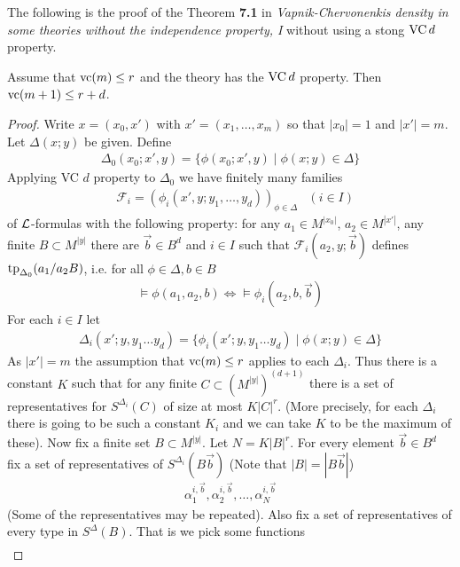 \documentclass{amsart}
\newcommand{\D}{\Delta}
\newcommand{\F}{\mathcal F}
\begin{document}
The following is the proof of the Theorem \textbf{7.1} in \textit{Vapnik-Chervonenkis density in some theories without the independence property, I} without using a stong $\operatorname{VC} d$ property.
\ \\
\begin{Theorem}
	Assume that $\operatorname{vc}(m) \leq r$ and the theory has the $\operatorname{VC} d$ property. Then $\operatorname{vc}(m+1) \leq r + d$.
\end{Theorem}
\begin{proof}
	Write $x = (x_0, x')$ with $x' = (x_1, \ldots, x_m)$ so that $|x_0| = 1$ and $|x'| = m$. Let $\D(x;y)$ be given. Define
	\begin{align*}
		\D_0(x_0;x', y) = \{\phi(x_0; x', y) \mid \phi(x;y) \in \D\}
	\end{align*}
	Applying VC $d$ property to $\D_0$ we have finitely many families 
	\begin{align*}
		&\F_i = (\phi_i(x', y; y_1, \ldots, y_d))_{\phi \in \D} &(i \in I)
	\end{align*}
	of $\mathcal L$-formulas with the following property: for any $a_1 \in M^{|x_0|}$, $a_2 \in M^{|x'|}$, any finite $B \subset M^{|y|}$ there are $\vec b \in B^d$ and $i \in I$ such that $\F_i(a_2, y; \vec b)$ defines $\tp_{\D_0}(a_1/a_2B)$, i.e. for all $\phi \in \D, b \in B$
	\begin{align*}
		\models \phi(a_1, a_2, b) \iff \models \phi_i(a_2, b, \vec b)
	\end{align*}
	For each $i \in I$ let
	\begin{align*}
		\D_i(x';y, y_1 \ldots y_d) = \{\phi_i(x'; y, y_1 \ldots y_d) \mid \phi(x;y) \in \D\}
	\end{align*}
	As $|x'| = m$ the assumption that $\operatorname{vc}(m) \leq r$ applies to each $\D_i$. Thus there is a constant $K$ such that for any finite $C \subset (M^{|y|})^{(d+1)}$ there is a set of representatives for $S^{\D_i}(C)$ of size at most $K|C|^r$. (More precisely, for each $\D_i$ there is going to be such a constant $K_i$ and we can take $K$ to be the maximum of these). Now fix a finite set $B \subset M^{|y|}$. Let $N = K|B|^r$. For every element $\vec b \in B^d$ fix a set of representatives of $S^{\D_i}(B\vec b)$ (Note that $|B| = |B\vec b|$) 
	\begin{align*}
		\alpha^{i, \vec b}_1, \alpha^{i, \vec b}_2, \ldots, \alpha^{i, \vec b}_{N}
	\end{align*}
	(Some of the representatives may be repeated). Also fix a set of representatives of every type in $S^\D(B)$. That is we pick some functions
	\begin{align*}

\end{align*}
\end{proof}
\end{document}
